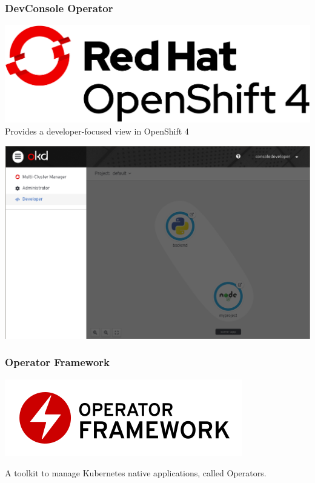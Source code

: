 \documentclass[aspectratio=169]{beamer}
\begin{document}
\begin{frame}
  \frametitle{DevConsole Operator}

  \includegraphics[scale=.15]{images/Logo-Red_Hat-OpenShift_4-A-Standard-RGB.png}\\[.25in]
  
  Provides a developer-focused view in OpenShift 4

\end{frame}

\begin{frame}

  \includegraphics[scale=.25]{images/devconsole.png}
  
\end{frame}

\begin{frame}
  \frametitle{Operator Framework}

  \includegraphics[scale=.50]{images/operator_logo_framework_color.png}
  
  A toolkit to manage Kubernetes native applications, called Operators.

\end{frame}
\end{document}
